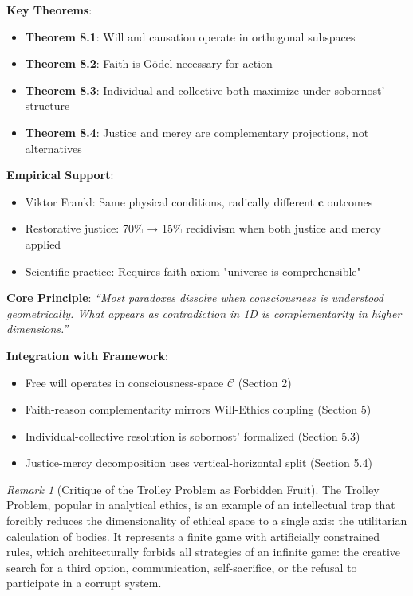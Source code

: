 \documentclass[11pt,a4paper]{article}
\theoremstyle{definition}
\theoremstyle{remark}
\newtheorem{remark}{Remark}[section]
\newcommand{\CC}{\mathcal{C}}
\newcommand{\cc}{\mathbf{c}}
\begin{document}
\begin{enumerate}
\begin{mdframed}[backgroundcolor=green!10,linewidth=2pt,linecolor=green!70!black]
\textbf{Key Theorems}:
\begin{itemize}[nosep]
    \item \textbf{Theorem 8.1}: Will and causation operate in orthogonal subspaces
    \item \textbf{Theorem 8.2}: Faith is Gödel-necessary for action
    \item \textbf{Theorem 8.3}: Individual and collective both maximize under sobornost' structure
    \item \textbf{Theorem 8.4}: Justice and mercy are complementary projections, not alternatives
\end{itemize}

\textbf{Empirical Support}:
\begin{itemize}[nosep]
    \item Viktor Frankl: Same physical conditions, radically different \(\cc\) outcomes
    \item Restorative justice: 70\% → 15\% recidivism when both justice and mercy applied
    \item Scientific practice: Requires faith-axiom "universe is comprehensible"
\end{itemize}

\textbf{Core Principle}: \textit{``Most paradoxes dissolve when consciousness is understood geometrically. What appears as contradiction in 1D is complementarity in higher dimensions.''}

\textbf{Integration with Framework}:
\begin{itemize}[nosep]
    \item Free will operates in consciousness-space \(\CC\) (Section 2)
    \item Faith-reason complementarity mirrors Will-Ethics coupling (Section 5)
    \item Individual-collective resolution is sobornost' formalized (Section 5.3)
    \item Justice-mercy decomposition uses vertical-horizontal split (Section 5.4)
\end{itemize}

\begin{remark}[Critique of the Trolley Problem as Forbidden Fruit]
The Trolley Problem, popular in analytical ethics, is an example of an intellectual trap that forcibly reduces the dimensionality of ethical space to a single axis: the utilitarian calculation of bodies. It represents a finite game with artificially constrained rules, which architecturally forbids all strategies of an infinite game: the creative search for a third option, communication, self-sacrifice, or the refusal to participate in a corrupt system.


\end{remark}
\end{mdframed}
\end{enumerate}
\end{document}
